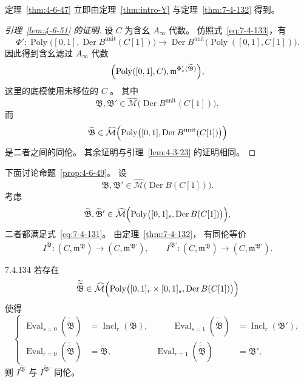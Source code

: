 定理~\ref{thm:4-6-47}
立即由定理~\ref{thm:intro-Y}
与定理~\ref{thm:7-4-132} 得到。

\begin{proof}[引理~\ref{lem:4-6-51} 的证明]
设 $C$ 为含幺 $A_\infty$ 代数。
仿照式~\eqref{eq:7-4-133}，有
\[
\Phi'\colon
\operatorname{Poly}
\bigl([0,1],\operatorname{Der}B^{\mathrm{unit}}(C[1])\bigr)
\longrightarrow
\operatorname{Der}B^{\mathrm{unit}}
\bigl(\operatorname{Poly}([0,1],C[1])\bigr).
\]
因此得到含幺滤过 $A_\infty$ 代数
\[
\Bigl(
\operatorname{Poly}([0,1],C),
\mathfrak m^{\Phi'_*(\widetilde{\mathfrak B})}
\Bigr),
\]
这里的底模使用未移位的 $C$
。
其中
\[
\mathfrak B,\mathfrak B'
\in
\widehat{\mathcal M}
\bigl(\operatorname{Der}B^{\mathrm{unit}}(C[1])\bigr),
\]
而
\[
\widetilde{\mathfrak B}
\in
\widehat{\mathcal M}
\Bigl(
\operatorname{Poly}
\bigl([0,1],\operatorname{Der}B^{\mathrm{unit}}(C[1])\bigr)
\Bigr)
\]
是二者之间的同伦。
其余证明与引理~\ref{lem:4-3-23} 的证明相同。
\end{proof}

下面讨论命题~\ref{prop:4-6-49}。
设
\[
\mathfrak B,\mathfrak B'
\in
\widehat{\mathcal M}
\bigl(\operatorname{Der}B(C[1])\bigr).
\]
考虑
\[
\widetilde{\mathfrak B},
\widetilde{\mathfrak B}'
\in
\widehat{\mathcal M}
\Bigl(
\operatorname{Poly}
\bigl([0,1]_s,\operatorname{Der}B(C[1])\bigr)
\Bigr),
\]
二者都满足式~\eqref{eq:7-4-131}。
由定理~\ref{thm:7-4-132}，
有同伦等价
\[
I^{\widetilde{\mathfrak B}}\colon
(C,\mathfrak m^{\mathfrak B})
\longrightarrow(C,\mathfrak m^{\mathfrak B'}),
\qquad
I^{\widetilde{\mathfrak B}'}\colon
(C,\mathfrak m^{\mathfrak B})
\longrightarrow(C,\mathfrak m^{\mathfrak B'}).
\]

\begin{proposition}{7.4.134}\label{prop:7-4-134}
若存在
\[
\widetilde{\widetilde{\mathfrak B}}
\in
\widehat{\mathcal M}
\Bigl(
\operatorname{Poly}
\bigl([0,1]_r\times[0,1]_s,
\operatorname{Der}B(C[1])\bigr)
\Bigr)
\]
使得
\begin{equation}
\left\{
\begin{aligned}
\operatorname{Eval}_{s=0}
(\widetilde{\widetilde{\mathfrak B}})
&=\operatorname{Incl}_r(\mathfrak B),
&\qquad
\operatorname{Eval}_{s=1}
(\widetilde{\widetilde{\mathfrak B}})
&=\operatorname{Incl}_r(\mathfrak B'),\\
\operatorname{Eval}_{r=0}
(\widetilde{\widetilde{\mathfrak B}})
&=\widetilde{\mathfrak B},
&
\operatorname{Eval}_{r=1}
(\widetilde{\widetilde{\mathfrak B}})
&=\widetilde{\mathfrak B}',
\end{aligned}
\right.
\tag{7.4.135}\label{eq:7-4-135}
\end{equation}
则 $I^{\widetilde{\mathfrak B}}$
与 $I^{\widetilde{\mathfrak B}'}$ 同伦。
\end{proposition}

